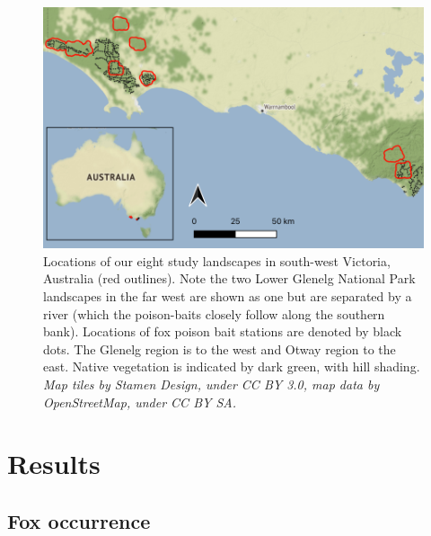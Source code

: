 \documentclass[11pt,a4paper,titlepage,twoside,openright]{style/unimelbthesis}
\begin{document}
\begin{mainmatter}
\newpage

\(~\)

\(~\)

\(~\)
\begin{figure}

{\centering \includegraphics[width=1\linewidth]{figure/map_density} 

}

\caption{Locations of our eight study landscapes in south-west Victoria, Australia (red outlines). Note the two Lower Glenelg National Park landscapes in the far west are shown as one but are separated by a river (which the poison-baits closely follow along the southern bank). Locations of fox poison bait stations are denoted by black dots. The Glenelg region is to the west and Otway region to the east. Native vegetation is indicated by dark green, with hill shading. \textit{Map tiles by Stamen Design, under CC BY 3.0, map data by OpenStreetMap, under CC BY SA.}}\label{fig:density-map}
\end{figure}
\newpage

\hypertarget{results-2}{%
\section{Results}\label{results-2}}

\hypertarget{fox-occurrence}{%
\subsection{Fox occurrence}\label{fox-occurrence}}


\end{mainmatter}
\end{document}
